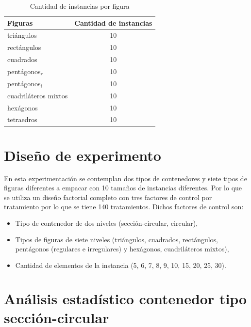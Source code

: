\documentclass[5p,times]{elsarticle}
\begin{document}
\begin{table}[H]
  \centering
  \caption{Cantidad de instancias por figura}

    \begin{tabular}{lc}
    \toprule
      Figuras &  Cantidad de instancias\\
    \midrule
         triángulos & 10    \\
         rectángulos& 10    \\
         cuadrados & 10   \\
       pentágonos$_r$ & 10    \\
           pentágonos$_i$ & 10     \\
           cuadriláteros mixtos  & 10  \\
          hexágonos & 10    \\
        tetraedros & 10   \\
          
    \bottomrule
    \end{tabular}%

  \label{tab:instancias}%
\end{table}%

\section{Diseño de experimento}\label{Section3}
	
	En esta experimentación se contemplan dos tipos de contenedores y siete tipos de figuras diferentes a empacar con 10 tamaños de instancias diferentes. Por lo que se utiliza un diseño factorial completo con tres factores de control por tratamiento por lo que se tiene 140 tratamientos. Dichos factores de control son: 

\begin{itemize}
    
    \item Tipo de contenedor de dos niveles (sección-circular, circular),
    \item Tipos de figuras de siete niveles (triángulos, cuadrados, rectángulos, pentágonos (regulares e irregulares) y hexágonos, cuadriláteros mixtos), 
    \item Cantidad de elementos de la instancia (5, 6, 7, 8, 9, 10, 15, 20, 25, 30).
\end{itemize}

\section{Análisis estadístico contenedor tipo sección-circular}\label{Section4}
\end{document}
